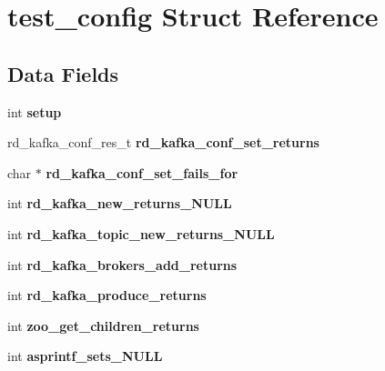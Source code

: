 \hypertarget{structtest__config}{\section{test\-\_\-config \-Struct \-Reference}
\label{structtest__config}
}
\subsection*{\-Data \-Fields}
\begin{DoxyCompactItemize}
\item 
\hypertarget{structtest__config_a3942b32032a000171742f126e13607d2}{int {\bfseries setup}}\label{structtest__config_a3942b32032a000171742f126e13607d2}

\item 
\hypertarget{structtest__config_a5874c7e35af748ee2da2dc2aad4ec903}{rd\-\_\-kafka\-\_\-conf\-\_\-res\-\_\-t {\bfseries rd\-\_\-kafka\-\_\-conf\-\_\-set\-\_\-returns}}\label{structtest__config_a5874c7e35af748ee2da2dc2aad4ec903}

\item 
\hypertarget{structtest__config_a13b45e925e2241e87ce751646f730be0}{char $\ast$ {\bfseries rd\-\_\-kafka\-\_\-conf\-\_\-set\-\_\-fails\-\_\-for}}\label{structtest__config_a13b45e925e2241e87ce751646f730be0}

\item 
\hypertarget{structtest__config_a0e09841bad2767e40180e1779db2d58c}{int {\bfseries rd\-\_\-kafka\-\_\-new\-\_\-returns\-\_\-\-N\-U\-L\-L}}\label{structtest__config_a0e09841bad2767e40180e1779db2d58c}

\item 
\hypertarget{structtest__config_aadee747b7f4c1523707dc80ced66c06a}{int {\bfseries rd\-\_\-kafka\-\_\-topic\-\_\-new\-\_\-returns\-\_\-\-N\-U\-L\-L}}\label{structtest__config_aadee747b7f4c1523707dc80ced66c06a}

\item 
\hypertarget{structtest__config_a6e20e3761d982cf3804eb7be5149a2b5}{int {\bfseries rd\-\_\-kafka\-\_\-brokers\-\_\-add\-\_\-returns}}\label{structtest__config_a6e20e3761d982cf3804eb7be5149a2b5}

\item 
\hypertarget{structtest__config_a6f7d96df9bfb99390aa635464437df3e}{int {\bfseries rd\-\_\-kafka\-\_\-produce\-\_\-returns}}\label{structtest__config_a6f7d96df9bfb99390aa635464437df3e}

\item 
\hypertarget{structtest__config_a6743877a0c30740ab3c1de3903291d88}{int {\bfseries zoo\-\_\-get\-\_\-children\-\_\-returns}}\label{structtest__config_a6743877a0c30740ab3c1de3903291d88}

\item 
\hypertarget{structtest__config_a211d0bc30b66785619572f2ad06dd9f3}{int {\bfseries asprintf\-\_\-sets\-\_\-\-N\-U\-L\-L}}\label{structtest__config_a211d0bc30b66785619572f2ad06dd9f3}

\end{DoxyCompactItemize}


